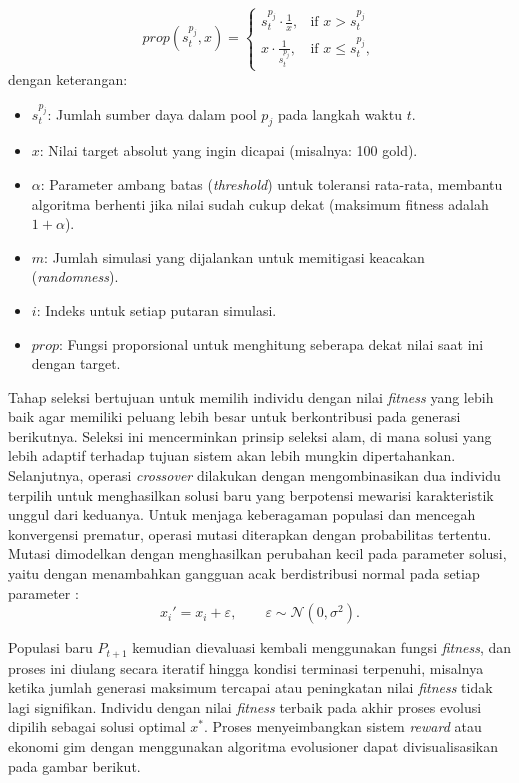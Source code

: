 \begin{equation}
    prop(s^{p_j}_t, x) = 
    \begin{cases} 
        s^{p_j}_t \cdot \frac{1}{x}, & \text{if } x > s^{p_j}_t \\
        x \cdot \frac{1}{s^{p_j}_t}, & \text{if } x \le s^{p_j}_t ,
    \end{cases}
\end{equation}
dengan keterangan:
\begin{itemize}
    \item $s^{p_j}_t$: Jumlah sumber daya dalam pool $p_j$ pada langkah waktu $t$.
    \item $x$: Nilai target absolut yang ingin dicapai (misalnya: 100 gold).
    \item $\alpha$: Parameter ambang batas (\textit{threshold}) untuk toleransi rata-rata, membantu algoritma berhenti jika nilai sudah cukup dekat (maksimum fitness adalah $1+\alpha$).
    \item $m$: Jumlah simulasi yang dijalankan untuk memitigasi keacakan (\textit{randomness}).
    \item $i$: Indeks untuk setiap putaran simulasi.
    \item $prop$: Fungsi proporsional untuk menghitung seberapa dekat nilai saat ini dengan target.
\end{itemize}


Tahap seleksi bertujuan untuk memilih individu dengan nilai \textit{fitness} yang lebih baik agar memiliki peluang lebih besar untuk berkontribusi pada generasi berikutnya. Seleksi ini mencerminkan prinsip seleksi alam, di mana solusi yang lebih adaptif terhadap tujuan sistem akan lebih mungkin dipertahankan. Selanjutnya, operasi \textit{crossover} dilakukan dengan mengombinasikan dua individu terpilih untuk menghasilkan solusi baru yang berpotensi mewarisi karakteristik unggul dari keduanya. Untuk menjaga keberagaman populasi dan mencegah konvergensi prematur, operasi mutasi diterapkan dengan probabilitas tertentu. Mutasi dimodelkan dengan menghasilkan perubahan kecil pada parameter solusi, yaitu dengan menambahkan gangguan acak berdistribusi normal pada setiap parameter : 
\begin{equation}
x_i' = x_i + \varepsilon, \qquad \varepsilon \sim \mathcal{N}(0, \sigma^2).
\end{equation}

Populasi baru $P_{t+1}$ kemudian dievaluasi kembali menggunakan fungsi \textit{fitness}, dan proses ini diulang secara iteratif hingga kondisi terminasi terpenuhi, misalnya ketika jumlah generasi maksimum tercapai atau peningkatan nilai \textit{fitness} tidak lagi signifikan. Individu dengan nilai \textit{fitness} terbaik pada akhir proses evolusi dipilih sebagai solusi optimal $x^*$. Proses menyeimbangkan sistem \textit{reward} atau ekonomi gim dengan menggunakan algoritma evolusioner dapat divisualisasikan pada gambar berikut.

